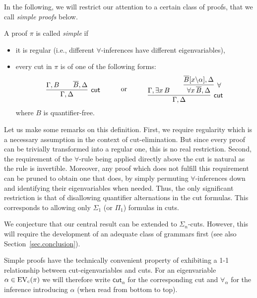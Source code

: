 \documentclass{LMCS}
\theoremstyle{plain}
\theoremstyle{definition}
\def\cutr{\mathsf{cut}}
\def\wcneg#1{\overline{#1}}
\newcommand{\sop}{[}
\newcommand{\scl}{]}
\newcommand{\sel}[2]{#1 \backslash #2}
\newcommand{\unsubst}[2]{\sop \sel{#1}{#2} \scl}
\newcommand{\dual}[1]{\wcneg{#1}}
\newcommand{\lkcut}[3][]{\infer[\cutr{#1}]{#2}{#3}}
\newcommand{\lku}[3][]{\infer[\forall{#1}]{#2}{#3}}
\newcommand{\forallrr}[1]{\forall_{#1}}
\newcommand{\cutrr}[1]{\cutr_{#1}}
\begin{document}
In the following, we will restrict our attention to a certain class of proofs,
that we call \emph{simple proofs} below.

\begin{defi}
A proof $\pi$ is called \emph{simple} if
\begin{itemize}
\item it is regular (i.e., different $\forall$-inferences
  have different eigenvariables),
\item every cut in $\pi$ is of
  one of the following forms:
  \begin{equation}
    \label{eq:simple}
    \vcenter{\lkcut{\Gamma,\Delta}{
        \Gamma, B
        &&
        \dual{B},\Delta
    }}
    \qqquor
    \vcenter{\lkcut{\Gamma,\Delta}{
        \Gamma,\exists x\, B
        &&
        \lku{\forall x\, \dual{B},\Delta}{
          \dual{B}\unsubst{x}{\alpha},\Delta
    }}}
  \end{equation}
  where $B$ is quantifier-free.
\end{itemize}
\end{defi}

Let us make some remarks on this definition. First, we require
regularity which is a necessary assumption in the context of
cut-elimination. But since every proof can be trivially transformed
into a regular one, this is no real restriction.  Second, the
requirement of the $\forall$-rule being applied directly above the cut
is natural as the rule is invertible. Moreover, any proof which does
not fulfill this requirement can be pruned to obtain one that does, by
simply permuting $\forall$-inferences down and identifying their
eigenvariables when needed. Thus, the only significant restriction is
that of disallowing quantifier alternations in the cut formulas. This
corresponds to allowing only $\Sigma_1$ (or $\Pi_1$) formulas in cuts.

We conjecture that our central result can be extended to
$\Sigma_n$-cuts. However, this will require the development of an
adequate class of grammars first (see also Section~\ref{sec.conclusion}).

\begin{obs}\label{obs:1-1}
  Simple proofs have the technically convenient property of exhibiting
  a 1-1 relationship between cut-eigenvariables and cuts.  For an
  eigenvariable $\alpha\in\mathrm{EV_c}(\pi)$ we will therefore write
  $\cutrr{\alpha}$ for the corresponding cut and $\forallrr\alpha$ for
  the inference introducing $\alpha$ (when read from bottom to top).
\end{obs}
\end{document}
